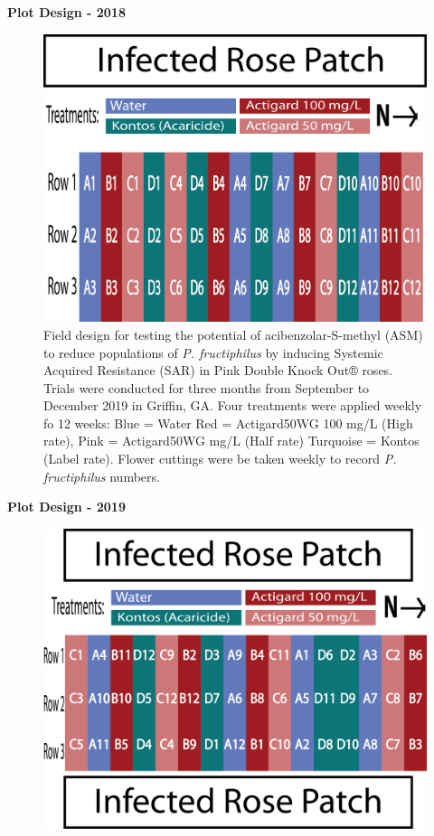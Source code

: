 \documentclass[12pt,final,CPage]{ufthesis}
\begin{document}
{  \textbf{Plot Design - 2018}
  \begin{figure}

  {\centering \includegraphics[width=0.8\linewidth]{figure/rrv_asm_plot_2018_griffin} 

  }

  \caption[Field design for testing the potential of acibenzolar-S-methyl (ASM) to reduce populations of \textit{P. fructiphilus}]{Field design for testing the potential of acibenzolar-S-methyl (ASM) to reduce populations of \textit{P. fructiphilus} by inducing Systemic Acquired Resistance (SAR) in Pink Double Knock Out® roses. Trials were conducted for three months from September to December 2019 in Griffin, GA. Four treatments were applied weekly fo 12 weeks: Blue = Water Red = Actigard50WG 100 \si{\milli\gram}/L (High rate),  Pink = Actigard50WG \si{\milli\gram}/L (Half rate) Turquoise = Kontos (Label rate). Flower cuttings were be taken weekly to record \textit{P. fructiphilus} numbers.}\label{fig:unnamed-chunk-1}
  \end{figure}
  \textbf{Plot Design - 2019}
  \begin{figure}

  {\centering \includegraphics[width=0.8\linewidth]{figure/rrv_asm_plot_2019_griffin} 

}
\end{figure}}
\end{document}
